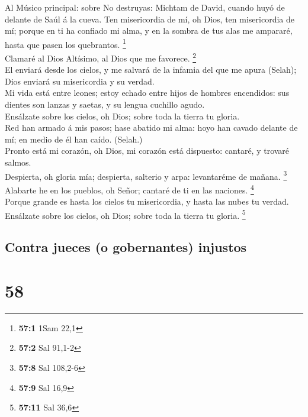  Al Músico principal: sobre No destruyas: Michtam de
David, cuando huyó de delante de Saúl á la cueva. Ten misericordia de
mí, oh Dios, ten misericordia de mí; porque en ti ha confiado mi alma, y
en la sombra de tus alas me ampararé, hasta que pasen los quebrantos.
\footnote{\textbf{57:1} 1Sam 22,1}\\
 Clamaré al Dios Altísimo, al Dios que me favorece.
\footnote{\textbf{57:2} Sal 91,1-2}\\
 El enviará desde los cielos, y me salvará de la infamia
del que me apura (Selah); Dios enviará su misericordia y su verdad.\\
 Mi vida está entre leones; estoy echado entre hijos de
hombres encendidos: sus dientes son lanzas y saetas, y su lengua
cuchillo agudo.\\
 Ensálzate sobre los cielos, oh Dios; sobre toda la tierra
tu gloria.\\
 Red han armado á mis pasos; hase abatido mi alma: hoyo
han cavado delante de mí; en medio de él han caído. (Selah.)\\
 Pronto está mi corazón, oh Dios, mi corazón está
dispuesto: cantaré, y trovaré salmos.\\
 Despierta, oh gloria mía; despierta, salterio y arpa:
levantaréme de mañana. \footnote{\textbf{57:8} Sal 108,2-6}\\
 Alabarte he en los pueblos, oh Señor; cantaré de ti en
las naciones. \footnote{\textbf{57:9} Sal 16,9}\\
 Porque grande es hasta los cielos tu misericordia, y
hasta las nubes tu verdad.\\
 Ensálzate sobre los cielos, oh Dios; sobre toda la
tierra tu gloria. \footnote{\textbf{57:11} Sal 36,6}

\hypertarget{contra-jueces-o-gobernantes-injustos}{%
\subsection{Contra jueces (o gobernantes)
injustos}\label{contra-jueces-o-gobernantes-injustos}}

\hypertarget{section-57}{%
\section{58}\label{section-57}}

